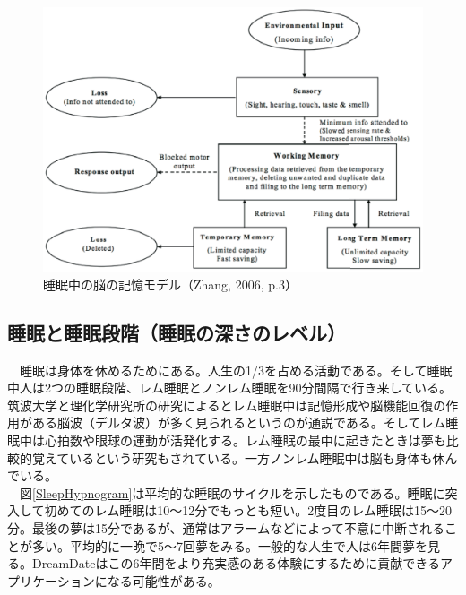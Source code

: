 \begin{figure}[htbp]
\begin{center}
\includegraphics[width=13cm]{eps/sleepBrainModel.eps}
\caption{睡眠中の脳の記憶モデル（Zhang, 2006, p.3）}
\label{brainZhang}
\end{center}
\end{figure}

\subsection{睡眠と睡眠段階（睡眠の深さのレベル）}
　睡眠は身体を休めるためにある。人生の1/3を占める活動である。そして睡眠中人は2つの睡眠段階、レム睡眠とノンレム睡眠を90分間隔で行き来している\cite{Dement}。筑波大学と理化学研究所の研究によるとレム睡眠中は記憶形成や脳機能回復の作用がある脳波（デルタ波）が多く見られるというのが通説である\cite{tsukuba}。そしてレム睡眠中は心拍数や眼球の運動が活発化する。レム睡眠の最中に起きたときは夢も比較的覚えているという研究もされている\cite{remNonrem}。一方ノンレム睡眠中は脳も身体も休んでいる。\\
　図\ref{SleepHypnogram}は平均的な睡眠のサイクルを示したものである\cite{hypnogram}。睡眠に突入して初めてのレム睡眠は10〜12分でもっとも短い。2度目のレム睡眠は15〜20分。最後の夢は15分であるが、通常はアラームなどによって不意に中断されることが多い。平均的に一晩で5〜7回夢をみる。一般的な人生で人は6年間夢を見る。DreamDateはこの6年間をより充実感のある体験にするために貢献できるアプリケーションになる可能性がある。

